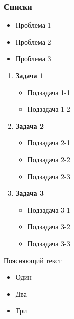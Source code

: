 \begin{frame}[allowframebreaks]
    \frametitle{Списки}
    \begin{itemize}
        \item Проблема 1
        \item Проблема 2
        \item Проблема 3
    \end{itemize}
    \framebreak
    \begin{enumerate}
        \item \textbf{Задача 1}
              \begin{itemize}
                  \item Подзадача 1-1
                  \item Подзадача 1-2
              \end{itemize}
        \item \textbf{Задача 2}
              \begin{itemize}
                  \item Подзадача 2-1
                  \item Подзадача 2-2
                  \item Подзадача 2-3
              \end{itemize}
        \item \textbf{Задача 3}
              \begin{itemize}
                  \item Подзадача 3-1
                  \item Подзадача 3-2
                  \item Подзадача 3-3
              \end{itemize}
    \end{enumerate}
    \framebreak
    Поясняющий текст
    \begin{itemize}
        \item Один
        \item Два
        \item Три
    \end{itemize}
\end{frame}
